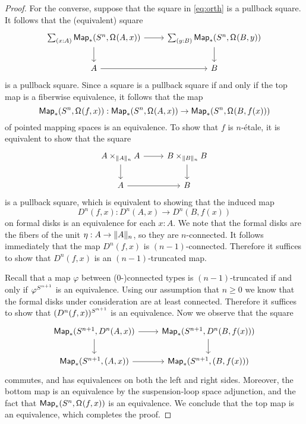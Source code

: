 \documentclass[9pt,twosided]{amsart}
\begin{document}
\begin{proof}
  For the converse, suppose that the square in \cref{eq:orth} is a pullback square. It follows that the (equivalent) square
  \begin{equation*}
    \begin{tikzcd}
      \sm{x:A}\mathsf{Map}_\ast(\sphere{n},\loopspace{A,x}) \arrow[r] \arrow[d] & \sm{y:B} \mathsf{Map}_\ast(\sphere{n},\loopspace{B,y}) \arrow[d] \\
      A \arrow[r] & B
    \end{tikzcd}
  \end{equation*}
is a pullback square.
  Since a square is a pullback square if and only if the top map is a fiberwise equivalence, it follows that the map
  \begin{equation*}
    \mathsf{Map}_\ast(S^{n},\mathsf{\Omega}^{}(f,x)):\mathsf{Map}_\ast(S^{n},\mathsf{\Omega}^{}(A,x)) \to \mathsf{Map}_\ast(S^{n},\mathsf{\Omega}^{}(B,f(x)))
  \end{equation*}
  of pointed mapping spaces is an equivalence. To show that $f$ is $n$-\'etale, it is equivalent to show that the square
  \begin{equation*}
    \begin{tikzcd}
      A\times_{\trunc{n}{A}} A \arrow[r] \arrow[d] & B \times_{\trunc{n}{B}} B \arrow[d] \\
      A \arrow[r] & B
    \end{tikzcd}
  \end{equation*}
  is a pullback square, which is equivalent to showing that the induced map
  \begin{equation*}
    D^{n}(f,x):D^{n}(A,x)\to D^{n}(B,f(x))
  \end{equation*}
  on formal disks is an equivalence for each $x:A$. We note that the formal disks are the fibers of the unit $\eta:A \to \trunc{n}{A}$, so they are $n$-connected. It follows immediately that the map $D^{n}(f,x)$ is $(n-1)$-connected. Therefore it suffices to show that $D^{n}(f,x)$ is an $(n-1)$-truncated map.

  Recall that a map $\varphi$ between ($0$-)connected types is $(n-1)$-truncated if and only if $\varphi^{S^{n+1}}$ is an equivalence. Using our assumption that $n\geq 0$ we know that the formal disks under consideration are at least connected. Therefore it suffices to show that $(D^{n}(f,x))^{S^{n+1}}$ is an equivalence. Now we observe that the square
  \begin{equation*}
    \begin{tikzcd}
      \mathsf{Map}_\ast(\sphere{n+1},D^{n}(A,x)) \arrow[r] \arrow[d] & \mathsf{Map}_\ast(\sphere{n+1},D^{n}(B,f(x))) \arrow[d] \\
      \mathsf{Map}_\ast(\sphere{n+1},(A,x)) \arrow[r] & \mathsf{Map}_\ast(\sphere{n+1},(B,f(x)))
    \end{tikzcd}
  \end{equation*}
  commutes, and has equivalences on both the left and right sides. Moreover, the bottom map is an equivalence by the suspension-loop space adjunction, and the fact that $\mathsf{Map}_\ast(S^{n},\mathsf{\Omega}^{}(f,x))$ is an equivalence. We conclude that the top map is an equivalence, which completes the proof.
\end{proof}
\end{document}
